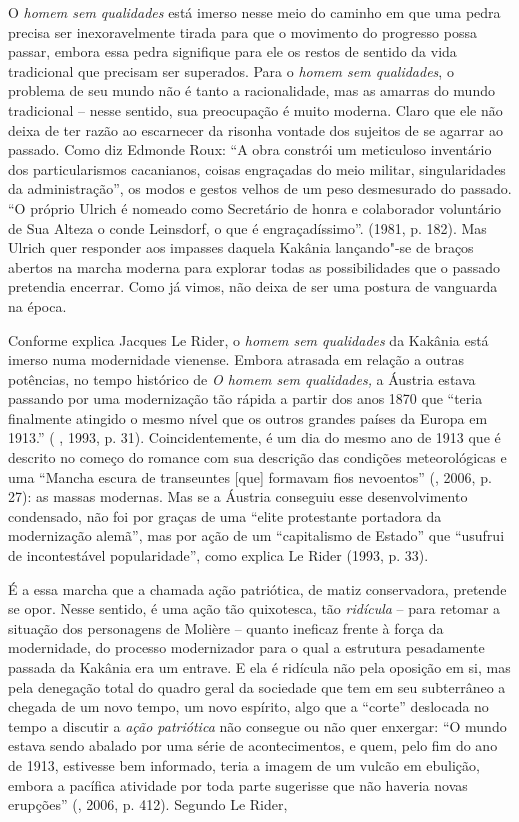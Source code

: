 {O \emph{homem sem qualidades} está imerso nesse meio do caminho em que
uma pedra precisa ser inexoravelmente tirada para que o movimento do
progresso possa passar, embora essa pedra signifique para ele os restos
de sentido da vida tradicional que precisam ser superados. Para o
\emph{homem sem qualidades}, o problema de seu mundo não é tanto a
racionalidade, mas as amarras do mundo tradicional -- nesse sentido, sua
preocupação é muito moderna. Claro que ele não deixa de ter razão ao
escarnecer da risonha vontade dos sujeitos de se agarrar ao passado.
Como diz Edmonde Roux: ``A obra constrói um meticuloso inventário dos
particularismos cacanianos, coisas engraçadas do meio militar,
singularidades da administração'', os modos e gestos velhos de um peso
desmesurado do passado. ``O próprio Ulrich é nomeado como Secretário de
honra e colaborador voluntário de Sua Alteza o conde Leinsdorf, o que é
engraçadíssimo''. (1981, p. 182). Mas Ulrich quer responder aos impasses
daquela Kakânia lançando"-se de braços abertos na marcha moderna para
explorar todas as possibilidades que o passado pretendia encerrar. Como
já vimos, não deixa de ser uma postura de vanguarda na época.

Conforme explica Jacques Le Rider, o \emph{homem sem qualidades} da
Kakânia está imerso numa modernidade vienense. Embora atrasada em
relação a outras potências, no tempo histórico de \emph{O homem sem
qualidades,} a Áustria estava passando por uma modernização tão rápida a
partir dos anos 1870 que ``teria finalmente atingido o mesmo nível que
os outros grandes países da Europa em 1913.'' ( , 1993, p. 31).
Coincidentemente, é um dia do mesmo ano de 1913 que é descrito no começo
do romance com sua descrição das condições meteorológicas e uma ``Mancha
escura de transeuntes [que] formavam fios nevoentos'' (, 2006,
p. 27): as massas modernas. Mas se a Áustria conseguiu esse
desenvolvimento condensado, não foi por graças de uma ``elite
protestante portadora da modernização alemã'', mas por ação de um
``capitalismo de Estado'' que ``usufrui de incontestável popularidade'',
como explica Le Rider (1993, p. 33).

É a essa marcha que a chamada ação patriótica, de matiz conservadora,
pretende se opor. Nesse sentido, é uma ação tão quixotesca, tão
\emph{ridícula} -- para retomar a situação dos personagens de Molière --
quanto ineficaz frente à força da modernidade, do processo modernizador
para o qual a estrutura pesadamente passada da Kakânia era um entrave. E
ela é ridícula não pela oposição em si, mas pela denegação total do
quadro geral da sociedade que tem em seu subterrâneo a chegada de um
novo tempo, um novo espírito, algo que a ``corte'' deslocada no tempo a
discutir a \emph{ação patriótica} não consegue ou não quer enxergar: ``O
mundo estava sendo abalado por uma série de acontecimentos, e quem, pelo
fim do ano de 1913, estivesse bem informado, teria a imagem de um vulcão
em ebulição, embora a pacífica atividade por toda parte sugerisse que
não haveria novas erupções'' (, 2006, p. 412). Segundo Le Rider,

}
